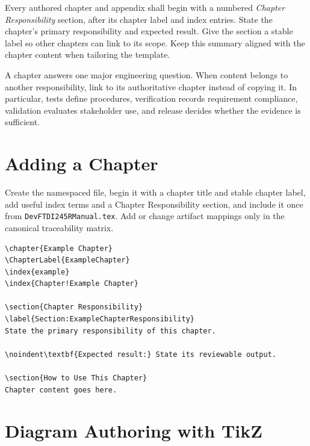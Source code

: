 Every authored chapter and appendix shall begin with a numbered
\textit{Chapter Responsibility} section, after its chapter label and index
entries. State the chapter's primary responsibility and expected result. Give
the section a stable label so other chapters can link to its scope. Keep this
summary aligned with the chapter content when tailoring the template.

A chapter answers one major engineering question. When content belongs
to another responsibility, link to its authoritative chapter instead of
copying it. In particular, tests define procedures, verification records
requirement compliance, validation evaluates stakeholder use, and release
decides whether the evidence is sufficient.

\section{Adding a Chapter}

Create the namespaced file, begin it with a chapter title and stable chapter
label, add useful index terms and a Chapter Responsibility section, and include it once from
\texttt{DevFTDI245RManual.tex}. Add or change artifact mappings only in the canonical
traceability matrix.

\begin{verbatim}
\chapter{Example Chapter}
\ChapterLabel{ExampleChapter}
\index{example}
\index{Chapter!Example Chapter}

\section{Chapter Responsibility}
\label{Section:ExampleChapterResponsibility}
State the primary responsibility of this chapter.

\noindent\textbf{Expected result:} State its reviewable output.

\section{How to Use This Chapter}
Chapter content goes here.
\end{verbatim}

\section{Diagram Authoring with TikZ}
\label{Section:TikZAuthoring}

